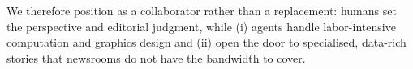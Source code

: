 We therefore position \methodshort{} as a collaborator rather than a replacement: humans set the perspective and editorial judgment, while (i) agents handle labor-intensive computation and graphics design and (ii) open the door to specialised, data-rich stories that newsrooms do not have the bandwidth to cover.